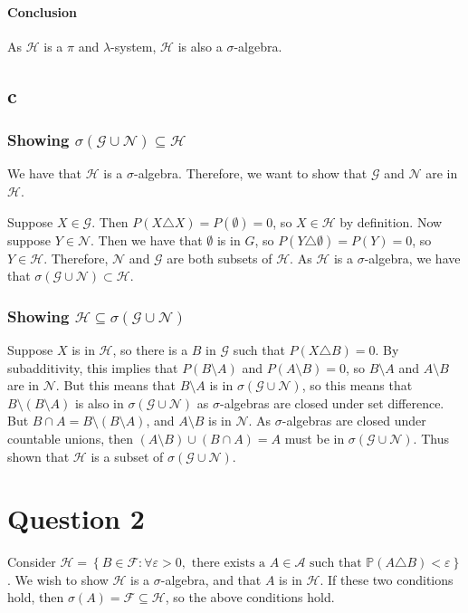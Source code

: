 \documentclass{article}
\theoremstyle{definition}
\numberwithin{theorem}{section}
\numberwithin{equation}{section}
\begin{document}
\paragraph{Conclusion}
As $\mathcal{H}$ is a $\pi$ and $\lambda$-system, $\mathcal{H}$ is also a $\sigma$-algebra. 

\subsection{c}
\subsubsection{Showing $ \sigma(\mathcal{G} \cup \mathcal{N}) \subseteq \mathcal{H}$}
We have that $\mathcal{H}$ is a $\sigma$-algebra. Therefore, we want to show that $\mathcal{G}$ and $\mathcal{N}$ are in $\mathcal{H}$. 

Suppose $X \in \mathcal{G}$. Then $P(X \triangle X) = P(\emptyset) = 0$, so $X \in \mathcal{H}$ by definition. Now suppose $Y \in \mathcal{N}$. Then we have that $\emptyset$ is in $G$, so $P(Y \triangle \emptyset)  = P(Y) = 0$, so $Y \in \mathcal{H}$. Therefore, $\mathcal{N}$ and $\mathcal{G}$ are both subsets of $\mathcal{H}$. As $\mathcal{H}$ is a $\sigma$-algebra, we have that $ \sigma(\mathcal{G} \cup \mathcal{N}) \subset \mathcal{H}$. 

\subsubsection{Showing $\mathcal{H} \subseteq \sigma(\mathcal{G} \cup \mathcal{N})$}
Suppose $X$ is in $\mathcal{H}$, so there is a $B$ in $\mathcal{G}$ such that $P(X \triangle B) = 0$. By subadditivity, this implies that $P(B \setminus A)$ and $P(A \setminus B) = 0$, so $B \setminus A$ and $A \setminus B$ are in $\mathcal{N}$. But this means that $B \setminus A$ is in $\sigma(\mathcal{G} \cup \mathcal{N})$, so this means that $B \setminus (B \setminus A)$ is also in $\sigma(\mathcal{G} \cup \mathcal{N})$ as $\sigma$-algebras are closed under set difference. But $B \cap A = B \setminus (B \setminus A)$, and $A \setminus B$ is in $\mathcal{N}$. As $\sigma$-algebras are closed under countable unions, then $(A \setminus B) \cup (B \cap A) = A$ must be in $\sigma(\mathcal{G} \cup \mathcal{N})$. Thus shown that $\mathcal{H}$ is a subset of $\sigma(\mathcal{G} \cup \mathcal{N})$. 


\section{Question 2}
Consider $\mathcal{H} = \left\{ B \in \mathcal{F}: \forall \varepsilon > 0, \text{ there exists a } A \in \mathcal{A} \text{ such that } \mathbb{P}(A \triangle B) < \varepsilon \right\}$. We wish to show $\mathcal{H}$ is a $\sigma$-algebra, and that $A$ is in $\mathcal{H}$. If these two conditions hold, then $\sigma(A) = \mathcal{F} \subseteq \mathcal{H}$, so the above conditions hold. 
\end{document}
